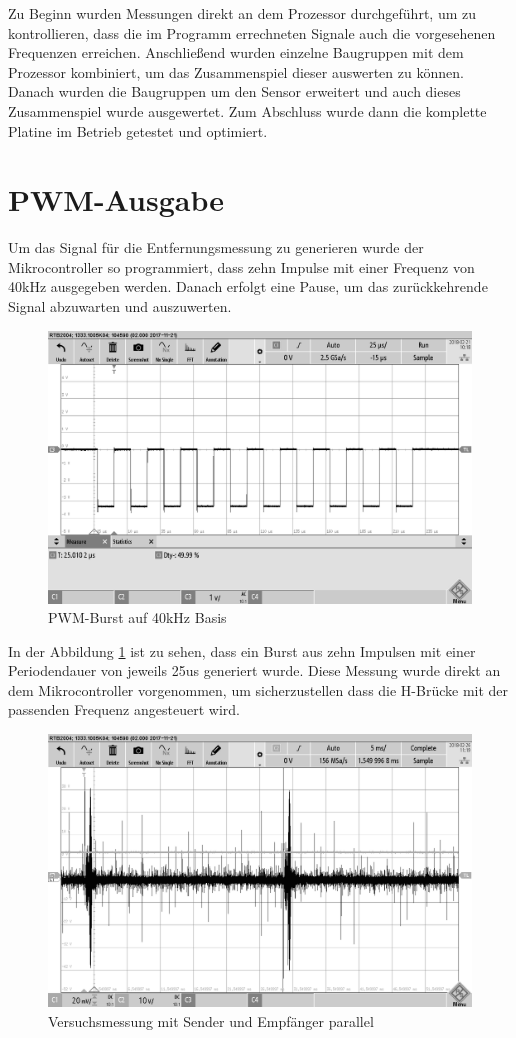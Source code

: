 
Zu Beginn wurden Messungen direkt an dem Prozessor durchgeführt, um zu kontrollieren, dass die im Programm errechneten Signale auch die vorgesehenen Frequenzen erreichen. Anschließend wurden einzelne Baugruppen mit dem Prozessor kombiniert, um das Zusammenspiel dieser auswerten zu können. Danach wurden die Baugruppen um den Sensor erweitert und auch dieses Zusammenspiel wurde ausgewertet. Zum Abschluss wurde dann die komplette Platine im Betrieb getestet und optimiert.

\section{PWM-Ausgabe}
Um das Signal für die Entfernungsmessung zu generieren wurde der Mikrocontroller so programmiert, dass zehn Impulse mit einer Frequenz von 40kHz ausgegeben werden. Danach erfolgt eine Pause, um das zurückkehrende Signal abzuwarten und auszuwerten.\\
\begin{figure}[H]
\includegraphics[width=1.0\textwidth]{Abbildungen/PWM-Signal.png}\caption{PWM-Burst auf 40kHz Basis}\label{fig:pwm-burst}
\end{figure}
In der Abbildung \ref{fig:pwm-burst} ist zu sehen, dass ein Burst aus zehn Impulsen mit einer Periodendauer von jeweils 25us generiert wurde. Diese Messung wurde direkt an dem Mikrocontroller vorgenommen, um sicherzustellen dass die H-Brücke mit der passenden Frequenz angesteuert wird.
\begin{figure}[H]
\includegraphics[width=1.0\textwidth]{Abbildungen/Abstand1.png}\caption{Versuchsmessung mit Sender und Empfänger parallel}\label{fig:Abstand1}
\end{figure}
